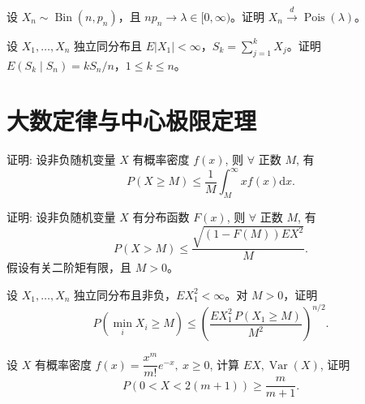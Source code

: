 \begin{exercise}[二项分布的泊松极限]\label{q:A6.34}
设 $X_n\sim\operatorname{Bin}(n,p_n)$，且 $np_n\to\lambda\in[0,\infty)$。证明 $X_n\xrightarrow{d}\operatorname{Pois}(\lambda)$。\par{}\end{exercise}

\begin{exercise}[给定总和后的部分和]\label{q:A6.35}
设 $X_1,\ldots,X_n$ 独立同分布且 $E|X_1|<\infty$，$S_k=\sum_{j=1}^kX_j$。证明 $E(S_k\mid S_n)=kS_n/n$，$1\le k\le n$。\par{}\end{exercise}

\clearpage\section{大数定律与中心极限定理}

\begin{exercise}[截尾期望的概率上界]\label{q:A7.2}
证明: 设非负随机变量 $X$ 有概率密度 $f(x)$, 则 $\forall$ 正数 $M$, 有
    \[P(X\geq M)\leq\dfrac{1}{M}\int_M^\infty xf(x)\mathrm{d}x.\]\par{}\end{exercise}

\begin{exercise}[柯西不等式与尾概率]\label{q:A7.3}
证明: 设非负随机变量 $X$ 有分布函数 $F(x)$, 则 $\forall$ 正数 $M$, 有
    \[P(X>M)\leq\dfrac{\sqrt{(1-F(M))EX^2}}{M}.\] 假设有关二阶矩有限，且 $M>0$。\par{}\end{exercise}

\begin{exercise}[最小值的概率界]\label{q:A7.4}
设 $X_1,\ldots,X_n$ 独立同分布且非负，$EX_1^2<\infty$。对 $M>0$，证明\[P(\min_iX_i\ge M)\le\left(\frac{EX_1^2\,P(X_1\ge M)}{M^2}\right)^{n/2}.\]\par{}\end{exercise}

\begin{exercise}[伽马矩与切比雪夫界]\label{q:A7.5}
设 $X$ 有概率密度 $f(x)=\dfrac{x^m}{m!}e^{-x},\ x\geq0$, 计算 $EX,\operatorname{Var}(X)$, 证明
    \[P(0<X<2(m+1))\geq\dfrac{m}{m+1}.\]\par{}\end{exercise}

